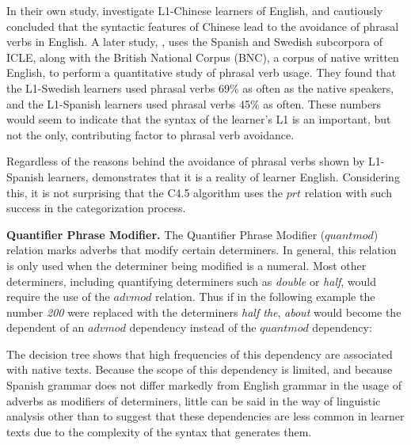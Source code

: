 \documentclass[main.tex]{subfiles}
\begin{document}
In their own study, \citeauthor{liao:2004} investigate L1-Chinese learners of English, and cautiously concluded that the syntactic features of Chinese lead to the avoidance of phrasal verbs in English. A later study, \citet{gonzalez:2010}, uses the Spanish and Swedish subcorpora of ICLE, along with the British National Corpus (BNC), a corpus of native written English, to perform a quantitative study of phrasal verb usage. They found that the L1-Swedish learners used phrasal verbs 69\% as often as the native speakers, and the L1-Spanish learners used phrasal verbs 45\% as often. These numbers would seem to indicate that the syntax of the learner's L1 is an important, but not the only, contributing factor to phrasal verb avoidance.

Regardless of the reasons behind the avoidance of phrasal verbs shown by L1-Spanish learners, \citet{gonzalez:2010} demonstrates that it is a reality of learner English. Considering this, it is not surprising that the C4.5 algorithm uses the $prt$ relation with such success in the categorization process.


\textbf{Quantifier Phrase Modifier.} The Quantifier Phrase Modifier ($quantmod$) relation marks adverbs that modify certain determiners. In general, this relation is only used when the determiner being modified is a numeral. Most other determiners, including quantifying determiners such as \textit{double} or \textit{half}, would require the use of the $advmod$ relation. Thus if in the following example \citet{typed-deps-manual} the number \textit{200} were replaced with the determiners \textit{half the}, \textit{about} would become the dependent of an $advmod$ dependency instead of the $quantmod$ dependency:
\newline\newline{}
\newline

The decision tree shows that high frequencies of this dependency are associated with native texts. Because the scope of this dependency is limited, and because Spanish grammar does not differ markedly from English grammar in the usage of adverbs as modifiers of determiners, little can be said in the way of linguistic analysis other than to suggest that these dependencies are less common in learner texts due to the complexity of the syntax that generates them.
\end{document}
